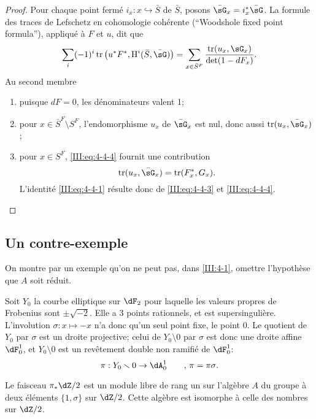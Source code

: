\begin{proof}
Pour chaque point fermé $i_x:x\hookrightarrow \bar  S$ de $\bar S$, posons 
$\bar\sG_x = i_x^*\bar\sG$. La formule des traces de Lefschetz en cohomologie 
cohérente (``Woodshole fixed point formula''), appliqué à $F$ et $u$, dit 
que 
\begin{equation}\label{III:eq:4-4-4}
  \sum_i (-1)^i \tr\left(u^* F^*, \h^i(\bar S,\bar\sG)\right) = \sum_{x\in \bar S^F} \frac{\tr(u_x,\sG_x)}{\det(1-d F_x)} \text{.}
\end{equation}
Au second membre
\begin{enumerate}[\indent a)]
  \item puisque $d F=0$, les dénominateurs valent 1;
  \item pour $x\in \bar S^F\setminus S^F$, l'endomorphisme $u_x$ de $\bar\sG_x$ 
    est nul, donc aussi $\tr(u_x,\bar\sG_x)$;
  \item pour $x\in S^F$, \eqref{III:eq:4-4-4} fournit une contribution 
    \[
      \tr(u_x,\bar\sG_x) = \tr(F_x^*,G_x) \text{.}
    \]
    L'identité \eqref{III:eq:4-4-1} résulte donc de \eqref{III:eq:4-4-3} 
    et \eqref{III:eq:4-4-4}. 
\end{enumerate}
\end{proof}





\subsection{Un contre-exemple}\label{III:4-5}

On montre par un exemple qu'on ne peut pas, dans \ref{III:4-1}, omettre 
l'hypothèse que $A$ soit réduit.

Soit $Y_0$ la courbe elliptique sur $\dF_2$ pour laquelle les valeurs propres 
de Frobenius sont $\pm \sqrt{-2}$. Elle a $3$ points rationnels, et est 
supersingulière. L'involution $\sigma:x\mapsto -x$ n'a donc qu'un seul point 
fixe, le point $0$. Le quotient de $Y_0$ par $\sigma$ est un droite projective; 
celui de $Y_0\setminus 0$ par $\sigma$ est donc une droite affine $\dF_0^1$, et 
$Y_0\setminus 0$ est un revêtement double non ramifié de $\dF_0^1$:
\[
  \pi:Y_0\setminus 0 \to \dA_0^1 \qquad \text{, $\pi=\pi\sigma$.}
\]

Le faisceau $\pi_*\dZ/2$ est un module libre de rang un sur l'algèbre $A$ du 
groupe à deux éléments $\{1,\sigma\}$ sur $\dZ/2$. Cette algèbre est 
isomorphe à celle des nombres sur $\dZ/2$. 

